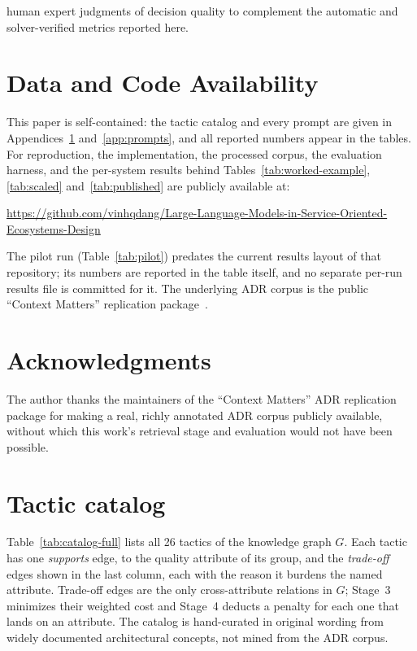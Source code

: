 \documentclass[preprint,12pt,authoryear]{elsarticle}
\renewcommand{\_}{\textunderscore\allowbreak{}}
\begin{document}
human expert judgments of decision quality to complement the automatic and solver-verified metrics reported here.

\section*{Data and Code Availability}
This paper is self-contained: the tactic catalog and every prompt are given in Appendices~\ref{app:catalog} and~\ref{app:prompts}, and all reported numbers appear in the tables. For reproduction, the implementation, the processed corpus, the evaluation harness, and the per-system results behind Tables~\ref{tab:worked-example}, \ref{tab:scaled} and~\ref{tab:published} are publicly available at:

\begin{center}
\footnotesize\url{https://github.com/vinhqdang/Large-Language-Models-in-Service-Oriented-Ecosystems-Design}
\end{center}

The pilot run (Table~\ref{tab:pilot}) predates the current results layout of that repository; its numbers are reported in the table itself, and no separate per-run results file is committed for it. The underlying ADR corpus is the public ``Context Matters'' replication package~\citep{contextmatters-zenodo}.

\section*{Acknowledgments}
The author thanks the maintainers of the ``Context Matters'' ADR replication package for making a real, richly annotated ADR corpus publicly available, without which this work's retrieval stage and evaluation would not have been possible.


\appendix
\section{Tactic catalog}
\label{app:catalog}

Table~\ref{tab:catalog-full} lists all 26 tactics of the knowledge graph $G$. Each tactic has one \emph{supports} edge, to the quality attribute of its group, and the \emph{trade-off} edges shown in the last column, each with the reason it burdens the named attribute. Trade-off edges are the only cross-attribute relations in $G$; Stage~3 minimizes their weighted cost and Stage~4 deducts a penalty for each one that lands on an attribute. The catalog is hand-curated in original wording from widely documented architectural concepts, not mined from the ADR corpus.
\end{document}
